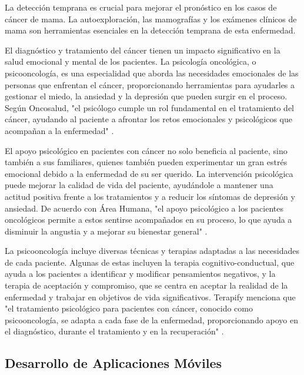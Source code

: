La detección temprana es crucial para mejorar el pronóstico en los casos de cáncer de mama. La autoexploración, las mamografías y los exámenes clínicos de mama son herramientas esenciales en la detección temprana de esta enfermedad.


El diagnóstico y tratamiento del cáncer tienen un impacto significativo en la salud emocional y mental de los pacientes. La psicología oncológica, o psicooncología, es una especialidad que aborda las necesidades emocionales de las personas que enfrentan el cáncer, proporcionando herramientas para ayudarles a gestionar el miedo, la ansiedad y la depresión que pueden surgir en el proceso. Según Oncosalud, "el psicólogo cumple un rol fundamental en el tratamiento del cáncer, ayudando al paciente a afrontar los retos emocionales y psicológicos que acompañan a la enfermedad" \parencite{oncosalud2023}.

El apoyo psicológico en pacientes con cáncer no solo beneficia al paciente, sino también a sus familiares, quienes también pueden experimentar un gran estrés emocional debido a la enfermedad de su ser querido. La intervención psicológica puede mejorar la calidad de vida del paciente, ayudándole a mantener una actitud positiva frente a los tratamientos y a reducir los síntomas de depresión y ansiedad. De acuerdo con Área Humana, "el apoyo psicológico a los pacientes oncológicos permite a estos sentirse acompañados en su proceso, lo que ayuda a disminuir la angustia y a mejorar su bienestar general" \parencite{areahumana2023}.

La psicooncología incluye diversas técnicas y terapias adaptadas a las necesidades de cada paciente. Algunas de estas incluyen la terapia cognitivo-conductual, que ayuda a los pacientes a identificar y modificar pensamientos negativos, y la terapia de aceptación y compromiso, que se centra en aceptar la realidad de la enfermedad y trabajar en objetivos de vida significativos. Terapify menciona que "el tratamiento psicológico para pacientes con cáncer, conocido como psicooncología, se adapta a cada fase de la enfermedad, proporcionando apoyo en el diagnóstico, durante el tratamiento y en la recuperación" \parencite{terapify2023}.


\subsection{Desarrollo de Aplicaciones Móviles}

